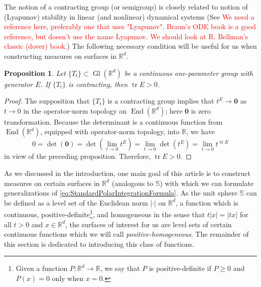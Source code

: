 \documentclass[11pt]{article}
\theoremstyle{theorem}
\newtheorem{proposition}[theorem]{Proposition}
\newcommand\End{\operatorname{End}} %
\newcommand\Gl{\operatorname{Gl}}                     %
\newcommand\tr{\operatorname{tr}}
\renewcommand\det{\operatorname{det}}
\begin{document}
\noindent The notion of a contracting group (or semigroup) is closely related to notion of (Lyapunov) stability in linear (and nonlinear) dynamical systems (See \textcolor{red}{We need a reference here, preferably one that uses "Lyapunov". Braun's ODE book is a good reference, but doesn't use the name Lyapunov. We should look at R. Bellman's classic (dover) book.}) The following necessary condition will be useful for us when constructing measures on surfaces in $\mathbb{R}^d$.

\begin{proposition}\label{prop:ContractingTrace}
Let $\{T_t\}\subset\Gl(\mathbb{R}^d)$ be a continuous one-parameter group with generator $E$. If $\{T_t\}$ is  contracting, then $\tr E>0$. 
\end{proposition}
\begin{proof}
The supposition that $\{T_t\}$ is a contracting group implies that $t^E\to \mathbf{0}$ as $t\to 0$ in the operator-norm topology on $\End(\mathbb{R}^d)$; here $\mathbf{0}$ is zero transformation. Because the determinant is a continuous function from $\End(\mathbb{R}^d)$, equipped with operator-norm topology, into $\mathbb{R}$, we have
\begin{equation*}
0=\det(\mathbf{0})=\det\left(\lim_{t\to 0}t^E\right)=\lim_{t\to 0}\det\left(t^E\right)=\lim_{t\to 0}t^{\tr E}
\end{equation*}
in view of the preceding proposition. Therefore, $\tr E>0$.
\end{proof}

\noindent As we discussed in the introduction, one main goal of this article is to construct measures on certain surfaces in $\mathbb{R}^d$ (analogous to $\mathbb{S}$) with which we can formulate generalizations of \eqref{eq:StandardPolarIntegrationFormula}. As the unit sphere $\mathbb{S}$ can be defined as a level set of the Euclidean norm $|\cdot|$ on $\mathbb{R}^d$, a function which is continuous,  positive-definite\footnote{Given a function $P:\mathbb{R}^d\to\mathbb{R}$, we say that $P$ is positive-definite if $P\geq 0$ and $P(x)=0$ only when $x=0$.}, and homogeneous in the sense that $t|x|=|tx|$ for all $t>0$ and $x\in\mathbb{R}^d$, the surfaces of interest for us are level sets of certain continuous functions which we will call \textit{positive-homogeneous}. The remainder of this section is dedicated to introducing this class of functions.\\
\end{document}
